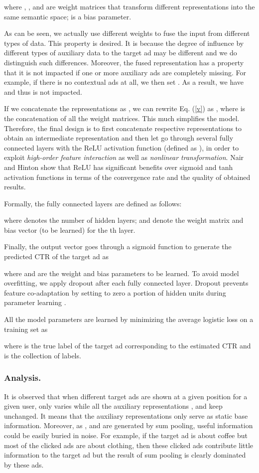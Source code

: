 \documentclass[sigconf]{acmart}
\begin{document}
where , ,  and  are weight matrices that transform different representations into the same semantic space;  is a bias parameter.

As can be seen, we actually use different weights to fuse the input from different types of data. This property is desired. It is because the degree of influence by different types of auxiliary data to the target ad may be different and we do distinguish such differences. Moreover, the fused representation  has a property that it is not impacted if one or more auxiliary ads are completely missing. For example, if there is no contextual ads at all, we then set . As a result, we have  and thus  is not impacted.

If we concatenate the representations as , we can rewrite Eq. (\ref{v}) as , where  is the concatenation of all the weight matrices.
This much simplifies the model. Therefore, the final design is to first concatenate respective representations to obtain an intermediate representation  and then let  go through several fully connected layers with the ReLU activation function (defined as ), in order to exploit \emph{high-order feature interaction} as well as \emph{nonlinear transformation}.
Nair and Hinton \cite{nair2010rectified} show that ReLU has significant benefits over sigmoid and tanh activation functions in terms of the convergence rate and the quality of obtained results.

Formally, the fully connected layers are defined as follows:

where  denotes the number of hidden layers;  and  denote the weight matrix and bias vector (to be learned) for the th layer.

Finally, the output vector  goes through a sigmoid function to generate the predicted CTR of the target ad as

where  and  are the weight and bias parameters to be learned.
To avoid model overfitting, we apply dropout \cite{srivastava2014dropout} after each fully connected layer. Dropout prevents feature co-adaptation by setting to zero a portion of hidden units during parameter learning \cite{goodfellow2013maxout}.

All the model parameters are learned by minimizing the average logistic loss on a training set as

where  is the true label of the target ad corresponding to the estimated CTR  and  is the collection of labels.

\subsubsection{Analysis.}
It is observed that when different target ads are shown at a given position for a given user, only  varies while all the auxiliary representations ,  and  keep unchanged. It means that the auxiliary representations only serve as static base information.
Moreover, as ,  and  are generated by sum pooling, useful information could be easily buried in noise. For example, if the target ad is about coffee but most of the clicked ads are about clothing, then these clicked ads contribute little information to the target ad but the result of sum pooling is clearly dominated by these ads.
\end{document}
